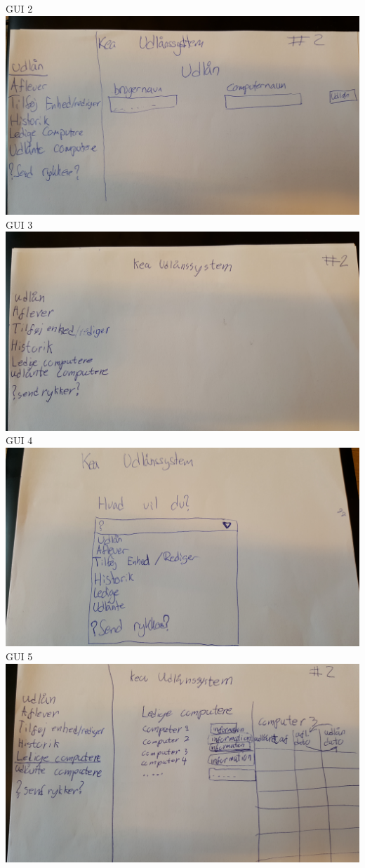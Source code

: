 \documentclass[a4paper]{article}
\begin{document}
GUI 2\\
\includegraphics[scale=0.07]{5.jpg}\\
GUI 3\\
\includegraphics[scale=0.07]{6.jpg}\\
GUI 4\\
\includegraphics[scale=0.07]{7.jpg}\\
GUI 5\\
\includegraphics[scale=0.07]{8.jpg}\\
\end{document}
